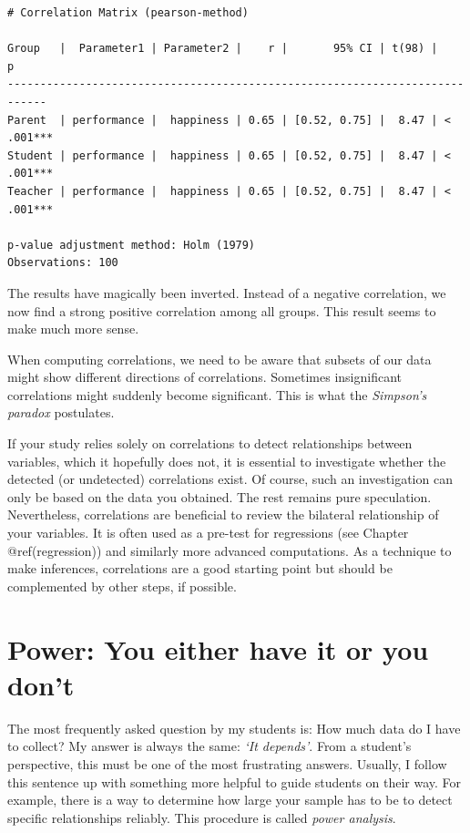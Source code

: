 \documentclass[
  letterpaper,
]{krantz}
\begin{document}
\begin{verbatim}
# Correlation Matrix (pearson-method)

Group   |  Parameter1 | Parameter2 |    r |       95% CI | t(98) |         p
----------------------------------------------------------------------------
Parent  | performance |  happiness | 0.65 | [0.52, 0.75] |  8.47 | < .001***
Student | performance |  happiness | 0.65 | [0.52, 0.75] |  8.47 | < .001***
Teacher | performance |  happiness | 0.65 | [0.52, 0.75] |  8.47 | < .001***

p-value adjustment method: Holm (1979)
Observations: 100
\end{verbatim}

The results have magically been inverted. Instead of a negative
correlation, we now find a strong positive correlation among all groups.
This result seems to make much more sense.

When computing correlations, we need to be aware that subsets of our
data might show different directions of correlations. Sometimes
insignificant correlations might suddenly become significant. This is
what the \emph{Simpson's paradox} postulates.

If your study relies solely on correlations to detect relationships
between variables, which it hopefully does not, it is essential to
investigate whether the detected (or undetected) correlations exist. Of
course, such an investigation can only be based on the data you
obtained. The rest remains pure speculation. Nevertheless, correlations
are beneficial to review the bilateral relationship of your variables.
It is often used as a pre-test for regressions (see Chapter
@ref(regression)) and similarly more advanced computations. As a
technique to make inferences, correlations are a good starting point but
should be complemented by other steps, if possible.


\chapter{Power: You either have it or you
don't}\label{sec-power-analysis}

The most frequently asked question by my students is: How much data do I
have to collect? My answer is always the same: \emph{`It depends'}. From
a student's perspective, this must be one of the most frustrating
answers. Usually, I follow this sentence up with something more helpful
to guide students on their way. For example, there is a way to determine
how large your sample has to be to detect specific relationships
reliably. This procedure is called \emph{power analysis}.
\end{document}
